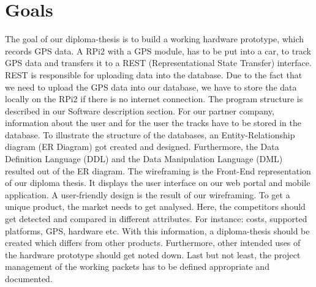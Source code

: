 \section*{Goals}
The goal of our diploma-thesis is to build a working hardware prototype, which records GPS data. A RPi2 with a GPS module, has to be put into a car, to track GPS data and transfers it to a REST (Representational State Transfer) interface. REST is responsible for uploading data into the database. Due to the fact that we need to upload the GPS data into our database, we have to store the data locally on the RPi2 if there is no internet connection. The program structure is described in our Software description section.
\newline \newline
For our partner company, information about the user and for the user the tracks have to be stored in the database. To illustrate the structure of the databases, an Entity-Relationship diagram (ER Diagram) got created and designed. Furthermore, the Data Definition Language (DDL) and the Data Manipulation Language (DML) resulted out of the ER diagram.
\newline \newline
The wireframing is the Front-End representation of our diploma thesis. It displays the user interface on our web portal and mobile application. A user-friendly design is the result of our wireframing.
\newline \newline
To get a unique product, the market needs to get analysed. Here, the competitors should get detected and compared in different attributes. For instance: costs, supported platforms, GPS, hardware etc. With this information, a diploma-thesis should be created which differs from other products. Furthermore, other intended uses of the hardware prototype should get noted down.
\newline \newline
Last but not least, the project management of the working packets has to be defined appropriate and documented.
